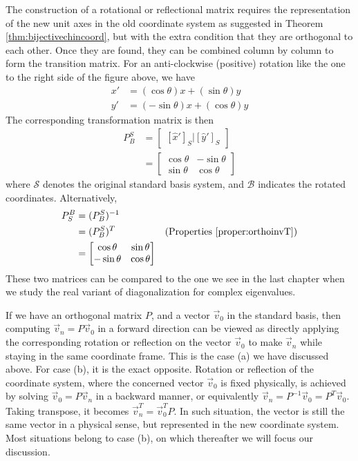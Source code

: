 The construction of a rotational or reflectional matrix requires the representation of the new unit axes in the old coordinate system as suggested in Theorem \ref{thm:bijectivechincoord}, but with the extra condition that they are orthogonal to each other. Once they are found, they can be combined column by column to form the transition matrix. For an anti-clockwise (positive) rotation like the one to the right side of the figure above, we have
\begin{align*}
x' &= (\cos \theta) x + (\sin \theta) y \\
y' &= (- \sin \theta) x + (\cos \theta) y
\end{align*}
The corresponding transformation matrix is then
\begin{align*}
P_B^S &= \begin{bmatrix}
[\hat{x}']_S|[\hat{y}']_S    
\end{bmatrix} \\
&= \begin{bmatrix}
\cos \theta & -\sin \theta \\
\sin \theta & \cos \theta
\end{bmatrix}
\end{align*}
where $\mathcal{S}$ denotes the original standard basis system, and $\mathcal{B}$ indicates the rotated coordinates. Alternatively,
\begin{align*}
P_S^B &= (P_B^S)^{-1} \\
&= (P_B^S)^T & \text{(Properties \ref{proper:orthoinvT})}\\
&= \begin{bmatrix}
\cos \theta & \sin \theta \\
-\sin \theta & \cos \theta
\end{bmatrix}
\end{align*}
These two matrices can be compared to the one we see in the last chapter when we study the real variant of diagonalization for complex eigenvalues. \par
If we have an orthogonal matrix $P$, and a vector $\vec{v}_0$ in the standard basis, then computing $\vec{v}_n = P\vec{v}_0$ in a forward direction can be viewed as directly applying the corresponding rotation or reflection on the vector $\vec{v}_0$ to make $\vec{v}_n$ while staying in the same coordinate frame. This is the case (a) we have discussed above. For case (b), it is the exact opposite. Rotation or reflection of the coordinate system, where the concerned vector $\vec{v}_0$ is fixed physically, is achieved by solving $\vec{v}_0 = P\vec{v}_n$ in a backward manner, or equivalently $\vec{v}_n = P^{-1}\vec{v}_0 = P^T\vec{v}_0$. Taking transpose, it becomes $\vec{v}_n^T = \vec{v}_0^T P$. In such situation, the vector is still the same vector in a physical sense, but represented in the new coordinate system. Most situations belong to case (b), on which thereafter we will focus our discussion.
